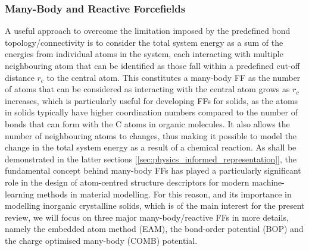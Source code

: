 \subsubsection{Many-Body and Reactive Forcefields}

A useful approach to overcome the limitation imposed by the predefined bond topology/connectivity is to consider the total system energy as a sum of  the energies from individual atoms in the system, each interacting with multiple neighbouring atom that can be identified as those fall within a predefined cut-off distance $r_c$ to the central atom. This  constitutes a many-body FF as the number of atoms that can be considered as interacting with the central atom grows as $r_c$ increases, which is particularly useful for developing FFs for solids,  as the atoms in solids typically have  higher coordination numbers compared to the number of bonds that can form with the C atoms in organic molecules. It also allows the number of neighbouring atoms to changes, thus making it possible to model the change in the total system energy as a result of a chemical reaction. As shall be demonstrated in the latter sections [\cref{sec:physics_informed_representation}], the fundamental concept behind many-body FFs has played a particularly significant role in the design of atom-centred structure descriptors for modern machine-learning methods in material modelling. For this reason, and its importance in modelling inorganic crystalline solids, which is of the main interest for the present review, we will focus on three major many-body/reactive FFs in more details, namely the embedded atom method (EAM), the bond-order potential (BOP) and the charge optimised many-body (COMB) potential.
 
